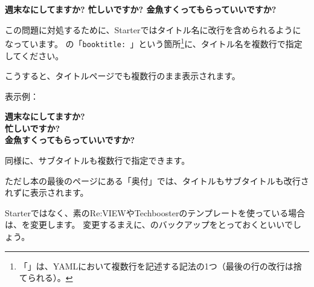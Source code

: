 \begin{center}
  \gtfamily\sffamily\bfseries\ebseries\Huge
  週末なにしてますか?
  忙しいですか?
  金魚すくってもらっていいですか?
\end{center}
\bigskip

この問題に対処するために、Starterではタイトル名に改行を含められるようになっています。
の「\texttt{booktitle: \textbar{}{-}}」という箇所\footnote{「\texttt{\textbar{}{-}}」は、YAMLにおいて複数行を記述する記法の1つ（最後の行の改行は捨てられる）。}に、タイトル名を複数行で指定してください。

\begin{starterprogram}\end{starterprogram}

こうすると、タイトルページでも複数行のまま表示されます。

表示例：

\begin{center}
  \gtfamily\sffamily\bfseries\ebseries\Huge
  週末なにしてますか?\\
  忙しいですか?\\
  金魚すくってもらっていいですか?\par
\end{center}
\bigskip

同様に、サブタイトルも複数行で指定できます。

ただし本の最後のページにある「奥付」では、タイトルもサブタイトルも改行されずに表示されます。

Starterではなく、素のRe:VIEWやTechboosterのテンプレートを使っている場合は、を変更します。
変更するまえに、のバックアップをとっておくといいでしょう。

\begin{starterprogram}\end{starterprogram}

